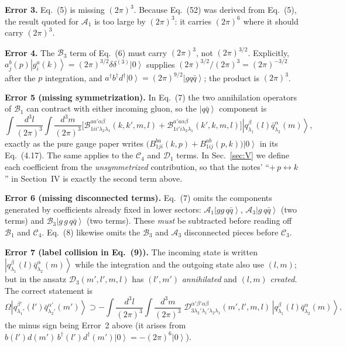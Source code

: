 \documentclass[11pt]{article}
\newcommand{\dg}{\dagger}
\newcommand{\ip}[1]{\int\!\frac{d^{3}#1}{(2\pi)^{3}}}
\newcommand{\dthree}{\delta^{(3)}}
\newcommand{\ket}[1]{\left|#1\right\rangle}
\newcommand{\vac}{\ket{0}}
\newcommand{\OM}{\Omega}
\newcommand{\qk}[3]{q^{#1}_{#2}(#3)}
\newcommand{\aqk}[3]{\bar q^{#1}_{#2}(#3)}
\newcommand{\gl}[3]{g^{#1}_{#2}(#3)}
\begin{document}
\begin{err}
\textbf{Error 3.} Eq.~(5) is missing $(2\pi)^{3}$. Because Eq.~(52) was derived from Eq.~(5), the
result quoted for $\mathcal A_1$ is too large by $(2\pi)^{3}$: it carries $(2\pi)^{6}$ where it
should carry $(2\pi)^{3}$.

\textbf{Error 4.} The $\mathcal B_3$ term of Eq.~(6) must carry $(2\pi)^{3}$, not
$(2\pi)^{3/2}$. Explicitly, $a^{b}_{j}(p)\ket{\gl{a}{i}{k}}=(2\pi)^{3/2}\delta\dthree\vac$
supplies $(2\pi)^{3/2}/(2\pi)^{3}=(2\pi)^{-3/2}$ after the $p$ integration, and
$a^{\dg}b^{\dg}d^{\dg}\vac=(2\pi)^{9/2}\ket{gq\bar q}$; the product is $(2\pi)^{3}$.

\textbf{Error 5 (missing symmetrization).} In Eq.~(7) the two annihilation operators of
$\mathcal B_1$ can contract with either incoming gluon, so the $\ket{q\bar q}$ component is
\[
\ip{l}\ip{m}\Big[\mathcal B^{aa'\alpha\beta}_{1ii'\lambda_2\lambda_1}(k,k',m,l)
+\mathcal B^{a'a\alpha\beta}_{1i'i\lambda_2\lambda_1}(k',k,m,l)\Big]
\ket{\qk{\beta}{\lambda_1}{l}\aqk{\alpha}{\lambda_2}{m}},
\]
exactly as the pure gauge paper writes $\big(B^{ba}_{1ji}(k,p)+B^{ab}_{1ij}(p,k)\big)\vac$ in its
Eq.~(4.17). The same applies to the $\mathcal C_4$ and $\mathcal D_1$ terms. In Sec.~\ref{sec:V}
we define each coefficient from the \emph{unsymmetrized} contribution, so that the notes'
``$+\,p\leftrightarrow k$'' in Section~IV is exactly the second term above.

\textbf{Error 6 (missing disconnected terms).} Eq.~(7) omits the components generated by
coefficients already fixed in lower sectors: $\mathcal A_1\ket{gg\,q\bar q}$,
$\mathcal A_3\ket{g\,q\bar q}$ (two terms) and $\mathcal B_3\ket{g\,g\,q\bar q}$ (two terms).
These \emph{must} be subtracted before reading off $\mathcal B_1$ and $\mathcal C_4$. Eq.~(8)
likewise omits the $\mathcal B_3$ and $\mathcal A_3$ disconnected pieces before $\mathcal C_3$.

\textbf{Error 7 (label collision in Eq.~(9)).} The incoming state is written
$\ket{\qk{\beta}{\lambda_1}{l}\aqk{\alpha}{\lambda_2}{m}}$ while the integration and the outgoing
state also use $(l,m)$; but in the ansatz $\mathcal D_3(m',l',m,l)$ has $(l',m')$
\emph{annihilated} and $(l,m)$ \emph{created}. The correct statement is
\[
\OM\ket{\qk{\beta'}{\lambda_1'}{l'}\aqk{\alpha'}{\lambda_2'}{m'}}\supset
-\ip{l}\ip{m}\;\mathcal D^{\alpha'\beta'\alpha\beta}_{3\lambda_2'\lambda_1'\lambda_2\lambda_1}(m',l',m,l)\,
\ket{\qk{\beta}{\lambda_1}{l}\aqk{\alpha}{\lambda_2}{m}},
\]
the minus sign being Error~2 above (it arises from
$b(l')d(m')\,b^{\dg}(l')d^{\dg}(m')\vac=-(2\pi)^{6}\vac$).
\end{err}
\end{document}

